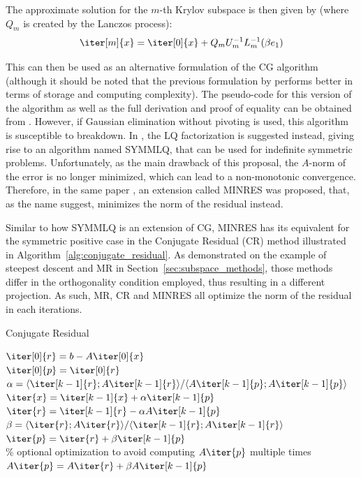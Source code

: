 \noindent The approximate solution for the $m$-th Krylov subspace is then given by (where $Q_m$ is created by the Lanczos process):
\begin{equation}
    \iter[m]{x} = \iter[0]{x} + Q_m U_m^{-1}L_m^{-1}(\beta e_1)
\end{equation}

\noindent This can then be used as an alternative formulation of the CG algorithm (although it should be noted that the previous formulation by \cite{hestenes_methods_1952} performs better in terms of storage and computing complexity). The pseudo-code for this version of the algorithm as well as the full derivation and proof of equality can be obtained from \cite{saad_iterative_2003}. However, if Gaussian elimination without pivoting is used, this algorithm is susceptible to breakdown. In \cite{paige_solution_1975}, the LQ factorization is suggested instead, giving rise to an algorithm named SYMMLQ, that can be used for indefinite symmetric problems. Unfortunately, as the main drawback of this proposal, the $A$-norm of the error is no longer minimized, which can lead to a non-monotonic convergence. Therefore, in the same paper \cite{paige_solution_1975}, an extension called MINRES was proposed, that, as the name suggest, minimizes the norm of the residual instead.

Similar to how SYMMLQ is an extension of CG, MINRES has its equivalent for the symmetric positive case in the Conjugate Residual (CR) method illustrated in Algorithm~\hyperref[alg:conjugate_residual]{\ref{alg:conjugate_residual}}. As demonstrated on the example of steepest descent and MR in Section~\hyperref[sec:subspace_methods]{\ref{sec:subspace_methods}}, those methods differ in the orthogonality condition employed, thus resulting in a different projection. As such, MR, CR and MINRES all optimize the norm of the residual in each iterations.


\begin{algorithm}[h]
  \caption{Conjugate Residual}
  \label{alg:conjugate_residual}
  \SetAlgoLined
  \DontPrintSemicolon
  $\iter[0]{r} = b-A\iter[0]{x}$ \\
  $\iter[0]{p} = \iter[0]{r}$ \\
   {
    $\alpha = \langle \iter[k-1]{r};A\iter[k-1]{r} \rangle / \langle A\iter[k-1]{p};A\iter[k-1]{p} \rangle$ \\
    $\iter{x} = \iter[k-1]{x}+\alpha \iter[k-1]{p}$ \\
    $\iter{r} = \iter[k-1]{r} - \alpha A\iter[k-1]{p}$ \\
    $\beta = \langle \iter{r};A\iter{r} \rangle / \langle \iter[k-1]{r};A\iter[k-1]{r} \rangle$ \\
    $\iter{p} = \iter{r} + \beta \iter[k-1]{p}$ \\
    \% optional optimization to avoid computing $A\iter{p}$ multiple times \\
    $A\iter{p} = A\iter{r}+\beta A\iter[k-1]{p}$
  }
\end{algorithm}

